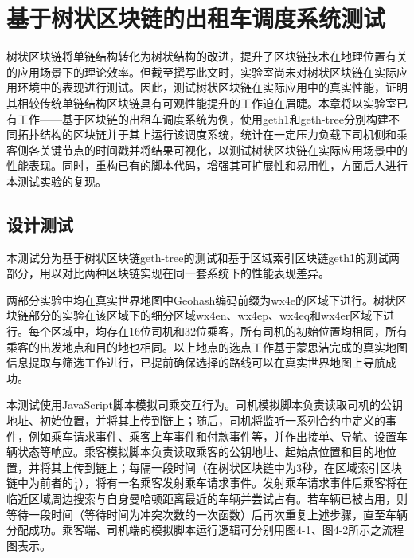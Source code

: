 %
%
%
%
%

\chapter{基于树状区块链的出租车调度系统测试}

树状区块链将单链结构转化为树状结构的改进，提升了区块链技术在地理位置有关的应用场景下的理论效率。但截至撰写此文时，实验室尚未对树状区块链在实际应用环境中的表现进行测试。因此，测试树状区块链在实际应用中的真实性能，证明其相较传统单链结构区块链具有可观性能提升的工作迫在眉睫。本章将以实验室已有工作——基于区块链的出租车调度系统为例，使用geth1和geth-tree分别构建不同拓扑结构的区块链并于其上运行该调度系统，统计在一定压力负载下司机侧和乘客侧各关键节点的时间戳并将结果可视化，以测试树状区块链在实际应用场景中的性能表现。同时，重构已有的脚本代码，增强其可扩展性和易用性，方面后人进行本测试实验的复现。

\section{设计测试}

本测试分为基于树状区块链geth-tree的测试和基于区域索引区块链geth1的测试两部分，用以对比两种区块链实现在同一套系统下的性能表现差异。

两部分实验中均在真实世界地图中Geohash编码前缀为wx4e的区域下进行。树状区块链部分的实验在该区域下的细分区域wx4en、wx4ep、wx4eq和wx4er区域下进行。每个区域中，均存在16位司机和32位乘客，所有司机的初始位置均相同，所有乘客的出发地点和目的地也相同。以上地点的选点工作基于蒙思洁完成的真实地图信息提取与筛选工作进行，已提前确保选择的路线可以在真实世界地图上导航成功。

本测试使用JavaScript脚本模拟司乘交互行为。司机模拟脚本负责读取司机的公钥地址、初始位置，并将其上传到链上；随后，司机将监听一系列合约中定义的事件，例如乘车请求事件、乘客上车事件和付款事件等，并作出接单、导航、设置车辆状态等响应。乘客模拟脚本负责读取乘客的公钥地址、起始点位置和目的地位置，并将其上传到链上；每隔一段时间（在树状区块链中为3秒，在区域索引区块链中为前者的$\frac14$），将有一名乘客发射乘车请求事件。发射乘车请求事件后乘客将在临近区域周边搜索与自身曼哈顿距离最近的车辆并尝试占有。若车辆已被占用，则等待一段时间（等待时间为冲突次数的一次函数）后再次重复上述步骤，直至车辆分配成功。乘客端、司机端的模拟脚本运行逻辑可分别用图4-1、图4-2所示之流程图表示。

